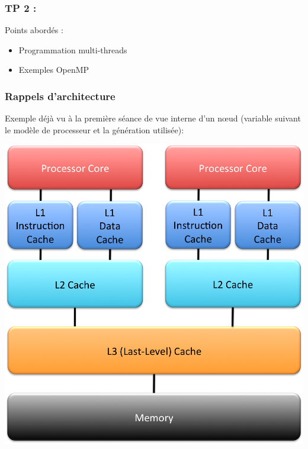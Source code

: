 \documentclass{beamer}
\begin{document}
\begin{frame}
	\frametitle{TP 2 :}
	\vfill
	\Large
	Points abord\'es :
	\vfill
	\begin{itemize}
		\item Programmation multi-threads
		\bigskip
		\item Exemples OpenMP
	\end{itemize}
	\vfill
\end{frame}

\begin{frame}
\frametitle{Rappels d'architecture}
	
	Exemple d\'ej\`a vu \`a la premi\`ere s\'eance de vue interne d'un n\oe ud (variable suivant le mod\`ele de processeur et la g\'en\'eration utilis\'ee):
	
	\begin{center}
		\includegraphics[scale=0.3]{architecture2}
	\end{center}

\end{frame}
	
\end{document}
